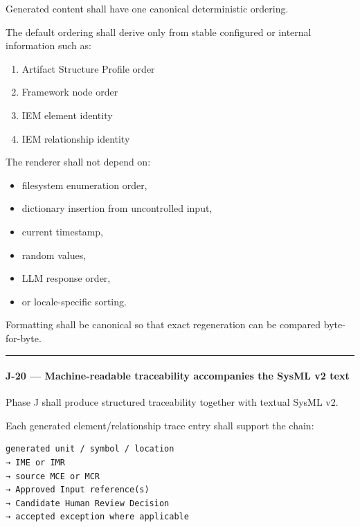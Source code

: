 Generated content shall have one canonical deterministic ordering.

The default ordering shall derive only from stable configured or internal information such as:

\begin{enumerate}
\def\labelenumi{\arabic{enumi}.}
\tightlist
\item
  Artifact Structure Profile order
\item
  Framework node order
\item
  IEM element identity
\item
  IEM relationship identity
\end{enumerate}

The renderer shall not depend on:

\begin{itemize}
\tightlist
\item
  filesystem enumeration order,
\item
  dictionary insertion from uncontrolled input,
\item
  current timestamp,
\item
  random values,
\item
  LLM response order,
\item
  or locale-specific sorting.
\end{itemize}

Formatting shall be canonical so that exact regeneration can be compared byte-for-byte.

\begin{center}\rule{0.5\linewidth}{0.5pt}\end{center}

\hypertarget{j-20--machine-readable-traceability-accompanies-the-sysml-v2-text}{%
\paragraph{J-20 --- Machine-readable traceability accompanies the SysML v2 text}\label{j-20--machine-readable-traceability-accompanies-the-sysml-v2-text}}

Phase J shall produce structured traceability together with textual SysML v2.

Each generated element/relationship trace entry shall support the chain:

\begin{verbatim}
generated unit / symbol / location
→ IME or IMR
→ source MCE or MCR
→ Approved Input reference(s)
→ Candidate Human Review Decision
→ accepted exception where applicable
\end{verbatim}

